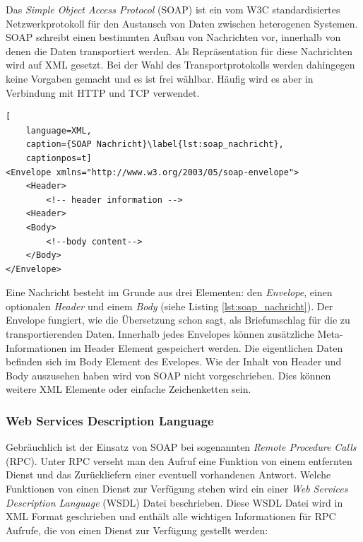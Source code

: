 Das \emph{Simple Object Access Protocol}\cite{Mitra2007} (SOAP) ist ein vom W3C standardisiertes Netzwerkprotokoll für den Austausch von Daten zwischen heterogenen Systemen. SOAP schreibt einen bestimmten Aufbau von Nachrichten vor, innerhalb von denen die Daten transportiert werden. Als Repräsentation für diese Nachrichten wird auf XML gesetzt. Bei der Wahl des Transportprotokolls werden dahingegen keine Vorgaben gemacht und es ist frei wählbar. Häufig wird es aber in Verbindung mit HTTP und TCP verwendet. 


\begin{lstlisting}[
    language=XML,
    caption={SOAP Nachricht}\label{lst:soap_nachricht},
    captionpos=t]
<Envelope xmlns="http://www.w3.org/2003/05/soap-envelope">
    <Header>
        <!-- header information -->
    <Header> 
    <Body>
        <!--body content-->
    </Body>
</Envelope>
\end{lstlisting}

Eine Nachricht besteht im Grunde aus drei Elementen: den \emph{Envelope}, einen optionalen \emph{Header} und einem \emph{Body} (siehe Listing \ref{lst:soap_nachricht}). Der Envelope fungiert, wie die Übersetzung schon sagt, als Briefumschlag für die zu transportierenden Daten. Innerhalb jedes Envelopes können zusätzliche Meta-Informationen im Header Element gespeichert werden. Die eigentlichen Daten befinden sich im Body Element des Evelopes. Wie der Inhalt von Header und Body auszusehen haben wird von SOAP nicht vorgeschrieben. Dies können weitere XML Elemente oder einfache Zeichenketten sein. 

\subsubsection{Web Services Description Language} %
\label{ssub:wsdl}


Gebräuchlich ist der Einsatz von SOAP bei sogenannten \emph{Remote Procedure  Calls} (RPC). Unter RPC verseht man den Aufruf eine Funktion von einem entfernten Dienst und das Zurückliefern einer eventuell vorhandenen Antwort. Welche Funktionen von einen Dienst zur Verfügung stehen wird ein einer \emph{Web Services Description Language}\cite{wsdl2001} (WSDL) Datei beschrieben. Diese WSDL Datei wird in XML Format geschrieben und enthält alle wichtigen Informationen für RPC Aufrufe, die von einen Dienst zur Verfügung gestellt werden: 

